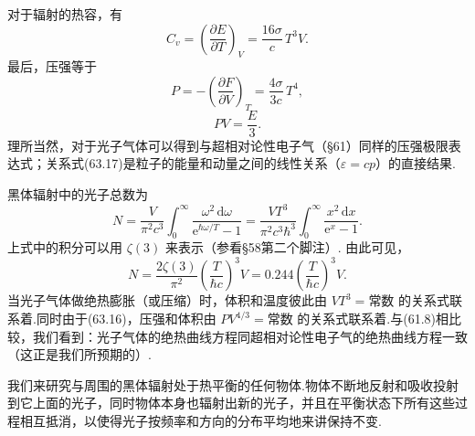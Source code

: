 对于辐射的热容，有
\begin{equation}
  C_v=\left(\frac{\partial E}{\partial T}\right)_V
  =\frac{16\sigma}{c}\,T^3V.
\end{equation}
最后，压强等于
\begin{equation}
  P=-\left(\frac{\partial F}{\partial V}\right)_T=\frac{4\sigma}{3c}\,T^4,
\end{equation}
\begin{equation}
  PV=\frac{E}{3}.
\end{equation}
理所当然，对于光子气体可以得到与超相对论性电子气（§61）同样的压强极限表达式；关系式(63.17)是粒子的能量和动量之间的线性关系（$\varepsilon=cp$）的直接结果.

黑体辐射中的光子总数为
\begin{equation*}
  N=\frac{V}{\pi^2c^3}\int_0^{\infty}
  \frac{\omega^2\,\mathrm{d}\omega}{\mathrm{e}^{\hbar\omega/T}-1}
  =\frac{VT^3}{\pi^2c^3\hbar^3}\int_0^{\infty}
  \frac{x^2\,\mathrm{d}x}{\mathrm{e}^x-1}.
\end{equation*}
上式中的积分可以用 $\zeta(3)$ 来表示（参看§58第二个脚注）. 由此可见，
\begin{equation}
  N=\frac{2\zeta(3)}{\pi^2}\left(\frac{T}{\hbar c}\right)^3V
  =0.244\left(\frac{T}{\hbar c}\right)^3V.
\end{equation}
当光子气体做绝热膨胀（或压缩）时，体积和温度彼此由 $VT^3=$常数 的关系式联系着.同时由于(63.16)，压强和体积由 $PV^{4/3}=$常数 的关系式联系着.与(61.8)相比较，我们看到：光子气体的绝热曲线方程同超相对论性电子气的绝热曲线方程一致（这正是我们所预期的）.

我们来研究与周围的黑体辐射处于热平衡的任何物体.物体不断地反射和吸收投射到它上面的光子，同时物体本身也辐射出新的光子，并且在平衡状态下所有这些过程相互抵消，以使得光子按频率和方向的分布平均地来讲保持不变.

